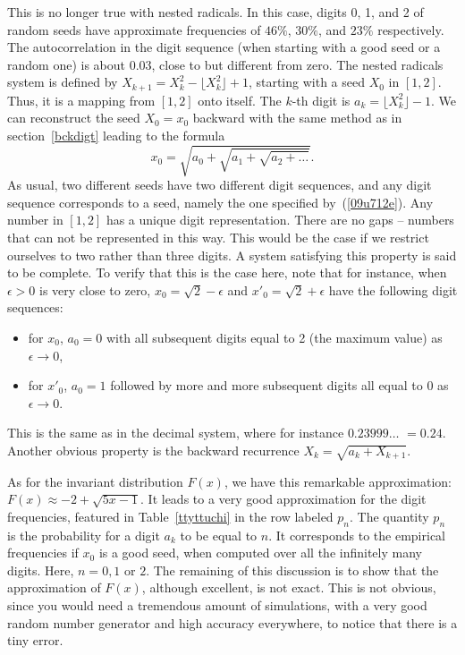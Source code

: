 \documentclass[oneside,10pt]{book}
\begin{document}
This is no longer true with nested radicals. In this case, digits 0, 1, and 2 of random seeds have approximate frequencies of 
$46\%$, $30\%$, and $23\%$ respectively. The autocorrelation in the digit sequence (when starting with a good seed or a random one) is about 0.03, close to but different from zero. The nested radicals system is defined by $X_{k+1}=X_k^2 - \lfloor X_k^2 \rfloor + 1$,
  starting with a seed $X_0$ in $[1,2]$. Thus, it is a mapping from $[1, 2]$ onto itself. The $k$-th digit is $a_k =\lfloor X_k^2 \rfloor -1$. 
We can reconstruct the seed $X_0 = x_0$ backward with the same method as in section~\ref{bckdigt} leading to the formula
\begin{equation}
x_0 = \sqrt{a_0 + \sqrt{a_1 + \sqrt{a_2+\dots}}}.\label{09u712e}
\end{equation}
As usual, two different seeds have two different digit sequences, and any digit sequence corresponds to a seed, namely the one specified
 by~(\ref{09u712e}). Any number in $[1,2]$ has a unique digit representation. There are no gaps -- numbers that can not be represented in this way. This would be the case if we restrict ourselves to two rather than three digits. A system satisfying
 this property is said to be \textcolor{index}{complete}. To verify that this is the case here,
 note that for instance, when $\epsilon>0$ is very close to zero, $x_0=\sqrt{2}-\epsilon$ and $x'_0=\sqrt{2}+\epsilon$ have the following
digit sequences:\vspace{1ex} 
\begin{itemize}
\item for $x_0$, $a_0=0$ with all subsequent digits equal to 2 (the maximum value) as $\epsilon\rightarrow 0$,
\item for $x'_0$, $a_0=1$ followed by more and more subsequent digits all equal to 0 as $\epsilon\rightarrow 0$.
\end{itemize}\vspace{1ex}
 This is the same as in the decimal system, where for instance $0.23999\dots$ $=0.24$. Another obvious property is the backward recurrence $X_k=\sqrt{a_k +X_{k+1}}$.

As for the invariant distribution $F(x)$, we have this remarkable
approximation: $F(x) \approx -2 +\sqrt{5x-1}$. It leads to a very good approximation for the digit frequencies, featured in
 Table~\ref{ttyttuchi} in the row labeled $p_n$. The quantity $p_n$ is the probability for a digit $a_k$ to be equal to $n$. It corresponds to the empirical frequencies if $x_0$ is a good seed, when computed over all the infinitely many digits. Here, $n=0,1$ or $2$. The remaining of
 this discussion is to show that the approximation of $F(x)$, although excellent, is not exact. This is not obvious, since you would
 need a tremendous amount of simulations, with a very good random number generator and high accuracy everywhere, to notice that there is a tiny error.
\end{document}
